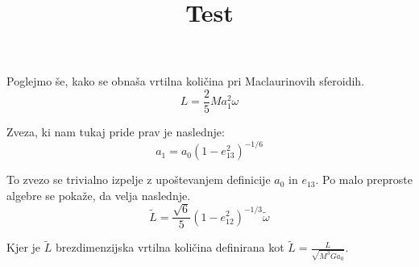 \documentclass{article}
\theoremstyle{definition}
\theoremstyle{plain}
\numberwithin{definition}{section}
\numberwithin{theorem}{section} \title{Test}
\begin{document}
Poglejmo še, kako se obnaša vrtilna količina pri Maclaurinovih sferoidih.
\begin{equation}
	L = \frac{2}{5} M a_1^2 \omega
	\label{eq:def_vrtilne_mac}
\end{equation}

Zveza, ki nam tukaj pride prav je naslednje:
\begin{equation}
	a_1 = a_0 (1 - e_{13}^2)^{-1/6}
	\label{eq:a1_a0}
\end{equation}

To zvezo se trivialno izpelje z upoštevanjem definicije $a_0$ in $e_{13}$. 
Po malo preproste algebre se pokaže, da velja naslednje.
\begin{equation}
	\tilde{L} = \frac{\sqrt{6}}{5} (1 - e_{12}^2)^{-1/3} \tilde{\omega}
	\label{eq:mc_vrtilna_kolicina}
\end{equation}

Kjer je $\tilde{L}$ brezdimenzijska vrtilna količina definirana kot
$\tilde{L} = \frac{L}{\sqrt{M^3 G a_0}}$.



% 
% 
% 

\end{document}
